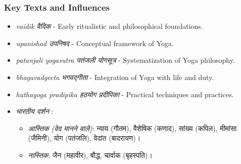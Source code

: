 \begin{frame}[fragile]\frametitle{Key Texts and Influences}

      \begin{itemize}
		\item \textit{vaidik वैदिक} - Early ritualistic and philosophical foundations.
		\item \textit{upanishad उपनिषद } - Conceptual framework of Yoga.
		\item \textit{patanjali yogasutra पतंजली योगसूत्र} - Systematization of Yoga philosophy.
		\item \textit{bhagavadgeeta भगवद्गीता} - Integration of Yoga with life and duty.
		\item \textit{hathayoga pradipika हठयोग प्रदीपिका } - Practical techniques and practices.
		\item \textit{भारतीय दर्शन} :
			\begin{itemize}
			\item \textit{आस्तिक (वेद मानने वाले)}: न्याय (गौतम), वैशेषिक (कणाद), सांख्य (कपिल), मीमांसा (जैमिनी), योग (पतंजलि), वेदांत (बादरायण)।
			\item \textit{नास्तिक}: जैन (महावीर), बौद्ध, चार्वाक (बृहस्पति)।
		    \end{itemize}
	  \end{itemize}

\end{frame}

